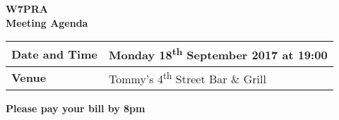 \documentclass[letter,11pt]{extarticle}
\begin{document}
	\thispagestyle{empty}
	
	\begin{center}
		\textbf{W7PRA\\Meeting Agenda}
		\vspace{0.33cm}
	\end{center}
	
	\begin{center}
		\begin{tabular}{| m{3.0cm} | m{7.5cm} |} \hline
			\textbf{Date and Time} & Monday 18\textsuperscript{th} September 2017 at 19:00 \\ \hline
			\textbf{Venue} & Tommy's 4\textsuperscript{th} Street Bar \& Grill \\ \hline
				\end{tabular}
	\end{center}
	
	\begin{center}
		\textbf{Please pay your bill by 8pm}
	\end{center}
	
\end{document}
